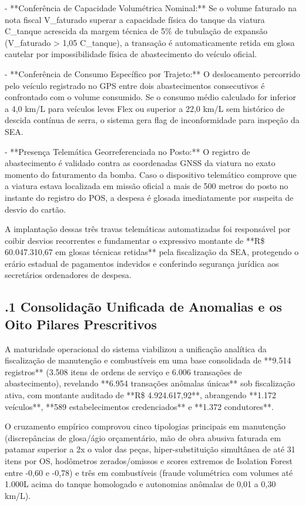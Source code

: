 \documentclass[12pt,a4paper]{article}
\begin{document}
- **Conferência de Capacidade Volumétrica Nominal:** Se o volume faturado na nota fiscal V\_{faturado} superar a capacidade física do tanque da viatura C\_{tanque} acrescida da margem técnica de 5\% de tubulação de expansão (V\_{faturado} > 1,05 C\_{tanque}), a transação é automaticamente retida em glosa cautelar por impossibilidade física de abastecimento do veículo oficial.

- **Conferência de Consumo Específico por Trajeto:** O deslocamento percorrido pelo veículo registrado no GPS entre dois abastecimentos consecutivos é confrontado com o volume consumido. Se o consumo médio calculado for inferior a 4,0 km/L para veículos leves Flex ou superior a 22,0 km/L sem histórico de descida contínua de serra, o sistema gera flag de inconformidade para inspeção da SEA.

- **Presença Telemática Georreferenciada no Posto:** O registro de abastecimento é validado contra as coordenadas GNSS da viatura no exato momento do faturamento da bomba. Caso o dispositivo telemático comprove que a viatura estava localizada em missão oficial a mais de 500 metros do posto no instante do registro do POS, a despesa é glosada imediatamente por suspeita de desvio do cartão.

A implantação dessas três travas telemáticas automatizadas foi responsável por coibir desvios recorrentes e fundamentar o expressivo montante de **R\$ 60.047.310,67 em glosas técnicas retidas** pela fiscalização da SEA, protegendo o erário estadual de pagamentos indevidos e conferindo segurança jurídica aos secretários ordenadores de despesa.


\subsection{.1 Consolidação Unificada de Anomalias e os Oito Pilares Prescritivos}

A maturidade operacional do sistema viabilizou a unificação analítica da fiscalização de manutenção e combustíveis em uma base consolidada de **9.514 registros** (3.508 itens de ordens de serviço e 6.006 transações de abastecimento), revelando **6.954 transações anômalas únicas** sob fiscalização ativa, com montante auditado de **R\$ 4.924.617,92**, abrangendo **1.172 veículos**, **589 estabelecimentos credenciados** e **1.372 condutores**.

O cruzamento empírico comprovou cinco tipologias principais em manutenção (discrepâncias de glosa/ágio orçamentário, mão de obra abusiva faturada em patamar superior a 2x o valor das peças, hiper-substituição simultânea de até 31 itens por OS, hodômetros zerados/omissos e scores extremos de Isolation Forest entre -0,60 e -0,78) e três em combustíveis (fraude volumétrica com volumes até 1.000L acima do tanque homologado e autonomias anômalas de 0,01 a 0,30 km/L).
\end{document}
